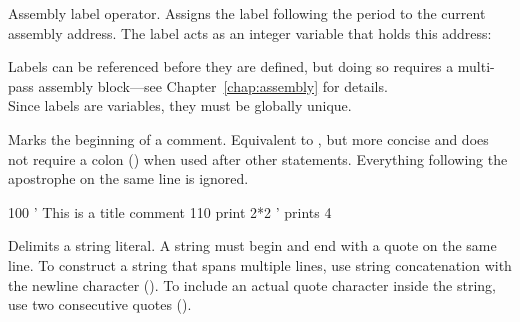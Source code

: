 \begin{entry}
Assembly label operator. Assigns the label following the period to the current assembly address. The label acts as an integer variable that holds this address:


Labels can be referenced before they are defined, but doing so requires a multi-pass assembly block---see Chapter~\ref{chap:assembly} for details.\\

Since labels are variables, they must be globally unique.
\end{entry}

\begin{entry}
Marks the beginning of a comment. Equivalent to , but more concise and does not require a colon \mbox{(\code{:})} when used after other statements. Everything following the apostrophe on the same line is ignored.

\begin{lstexample}
100 ' This is a title comment
110 print 2*2  ' prints 4
\end{lstexample}
\end{entry}

\begin{entry}
Delimits a string literal. A string must begin and end with a quote on the same line. To construct a string that spans multiple lines, use string concatenation with the newline character (). To include an actual quote character inside the string, use two consecutive quotes ().

\end{entry}

